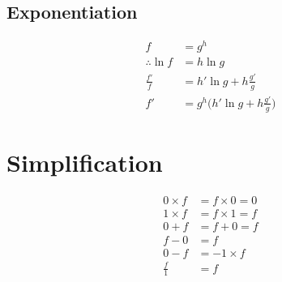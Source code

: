 \documentclass[12pt, a4paper]{article}
\begin{document}
	\subsection{Exponentiation}
	\begin{align*}
		f &= g^{h} \\
		\therefore \ln f &= h \ln g \\
		\frac{f'}{f} &= h' \ln g + h \frac{g'}{g} \\
		f' &= g^h \Big(h' \ln g + h \frac{g'}{g}\Big)
	\end{align*}
	
	\section{Simplification}
	\begin{align*}
		0\times f &= f\times 0 = 0 \\
		1\times f &= f\times 1 = f \\
		0 + f &= f + 0 = f \\
		f - 0 &= f \\
		0 - f &= -1 \times f \\ 
		\frac{f}{1} &= f 
	\end{align*}
\end{document}
